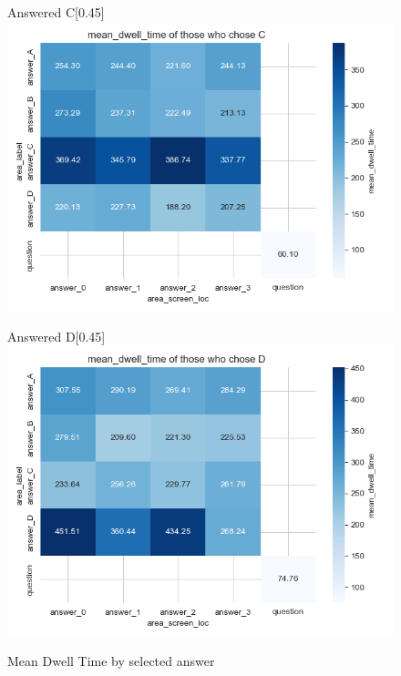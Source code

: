 \documentclass{article}
\begin{document}
\begin{figure}[H]
      \begin{subcaptionbox}{Answered C\label{fig:C_dt_g}}[0.45\textwidth]
        {\centering\includegraphics[width=\linewidth]{plots/matrix_plots/matrix_mean_dwell_time_C_gatherers.png}}
      \end{subcaptionbox}
      \hfill
      \begin{subcaptionbox}{Answered D\label{fig:D_dt_g}}[0.45\textwidth]
        {\centering\includegraphics[width=\linewidth]{plots/matrix_plots/matrix_mean_dwell_time_D_gatherers.png}}
      \end{subcaptionbox}
      
      \caption{Mean Dwell Time by selected answer}
  \label{fig:fourimages4}
\end{figure}
\newpage
\end{document}
